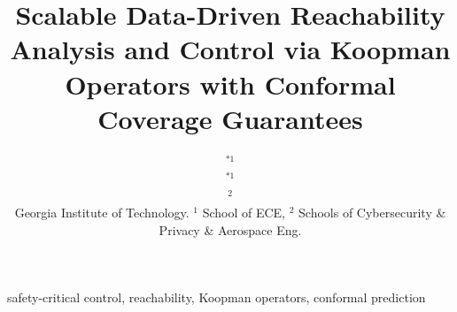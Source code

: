 \documentclass{l4dc2026}
\title[Scalable Koopman Reachability with Conformal Coverage Guarantees]{Scalable Data-Driven Reachability Analysis and Control via Koopman Operators with Conformal Coverage Guarantees}
\author{%
 \Name{Devesh Nath}$^{*1}$ \Email{dnath7@gatech.edu}\\
 \Name{Haoran Yin}$^{*1}$ \Email{hyin95@gatech.edu}\\
 \Name{Glen Chou}$^2$ \Email{chou@gatech.edu}\\
 \addr Georgia Institute of Technology. $^1$ School of ECE, $^2$ Schools of Cybersecurity \& Privacy \& Aerospace Eng.%
}
\begin{document}
\maketitle



\begin{abstract}

\end{abstract}

\begin{keywords}
  safety-critical control, reachability, Koopman operators, conformal prediction
\end{keywords}












\end{document}
